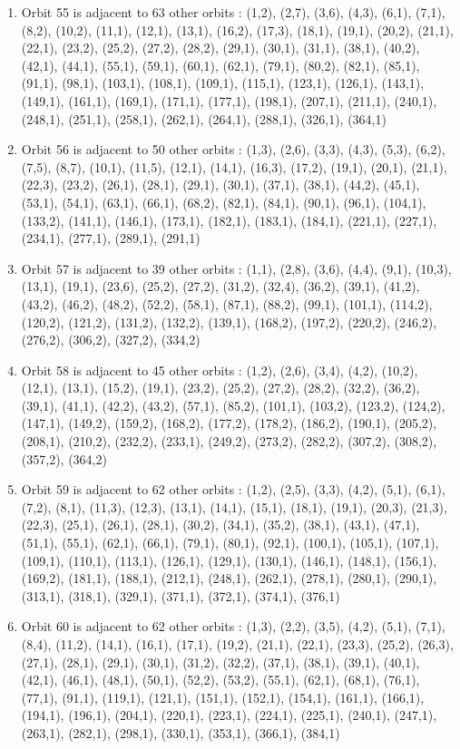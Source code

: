 \documentclass[12pt]{article}
\begin{document}
\begin{enumerate}
\item Orbit 55 is adjacent to 63 other orbits : (1,2), (2,7), (3,6), (4,3), (6,1), (7,1), (8,2), (10,2), (11,1), (12,1), (13,1), (16,2), (17,3), (18,1), (19,1), (20,2), (21,1), (22,1), (23,2), (25,2), (27,2), (28,2), (29,1), (30,1), (31,1), (38,1), (40,2), (42,1), (44,1), (55,1), (59,1), (60,1), (62,1), (79,1), (80,2), (82,1), (85,1), (91,1), (98,1), (103,1), (108,1), (109,1), (115,1), (123,1), (126,1), (143,1), (149,1), (161,1), (169,1), (171,1), (177,1), (198,1), (207,1), (211,1), (240,1), (248,1), (251,1), (258,1), (262,1), (264,1), (288,1), (326,1), (364,1)
\item Orbit 56 is adjacent to 50 other orbits : (1,3), (2,6), (3,3), (4,3), (5,3), (6,2), (7,5), (8,7), (10,1), (11,5), (12,1), (14,1), (16,3), (17,2), (19,1), (20,1), (21,1), (22,3), (23,2), (26,1), (28,1), (29,1), (30,1), (37,1), (38,1), (44,2), (45,1), (53,1), (54,1), (63,1), (66,1), (68,2), (82,1), (84,1), (90,1), (96,1), (104,1), (133,2), (141,1), (146,1), (173,1), (182,1), (183,1), (184,1), (221,1), (227,1), (234,1), (277,1), (289,1), (291,1)
\item Orbit 57 is adjacent to 39 other orbits : (1,1), (2,8), (3,6), (4,4), (9,1), (10,3), (13,1), (19,1), (23,6), (25,2), (27,2), (31,2), (32,4), (36,2), (39,1), (41,2), (43,2), (46,2), (48,2), (52,2), (58,1), (87,1), (88,2), (99,1), (101,1), (114,2), (120,2), (121,2), (131,2), (132,2), (139,1), (168,2), (197,2), (220,2), (246,2), (276,2), (306,2), (327,2), (334,2)
\item Orbit 58 is adjacent to 45 other orbits : (1,2), (2,6), (3,4), (4,2), (10,2), (12,1), (13,1), (15,2), (19,1), (23,2), (25,2), (27,2), (28,2), (32,2), (36,2), (39,1), (41,1), (42,2), (43,2), (57,1), (85,2), (101,1), (103,2), (123,2), (124,2), (147,1), (149,2), (159,2), (168,2), (177,2), (178,2), (186,2), (190,1), (205,2), (208,1), (210,2), (232,2), (233,1), (249,2), (273,2), (282,2), (307,2), (308,2), (357,2), (364,2)
\item Orbit 59 is adjacent to 62 other orbits : (1,2), (2,5), (3,3), (4,2), (5,1), (6,1), (7,2), (8,1), (11,3), (12,3), (13,1), (14,1), (15,1), (18,1), (19,1), (20,3), (21,3), (22,3), (25,1), (26,1), (28,1), (30,2), (34,1), (35,2), (38,1), (43,1), (47,1), (51,1), (55,1), (62,1), (66,1), (79,1), (80,1), (92,1), (100,1), (105,1), (107,1), (109,1), (110,1), (113,1), (126,1), (129,1), (130,1), (146,1), (148,1), (156,1), (169,2), (181,1), (188,1), (212,1), (248,1), (262,1), (278,1), (280,1), (290,1), (313,1), (318,1), (329,1), (371,1), (372,1), (374,1), (376,1)
\item Orbit 60 is adjacent to 62 other orbits : (1,3), (2,2), (3,5), (4,2), (5,1), (7,1), (8,4), (11,2), (14,1), (16,1), (17,1), (19,2), (21,1), (22,1), (23,3), (25,2), (26,3), (27,1), (28,1), (29,1), (30,1), (31,2), (32,2), (37,1), (38,1), (39,1), (40,1), (42,1), (46,1), (48,1), (50,1), (52,2), (53,2), (55,1), (62,1), (68,1), (76,1), (77,1), (91,1), (119,1), (121,1), (151,1), (152,1), (154,1), (161,1), (166,1), (194,1), (196,1), (204,1), (220,1), (223,1), (224,1), (225,1), (240,1), (247,1), (263,1), (282,1), (298,1), (330,1), (353,1), (366,1), (384,1)

\end{enumerate}
\end{document}
